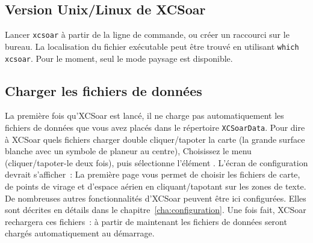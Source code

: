 \subsection*{Version Unix/Linux de XCSoar}
Lancer \verb|xcsoar| à partir de la ligne de commande, ou créer un raccourci sur le 
bureau. La localisation du fichier exécutable peut être trouvé en utilisant
\verb|which xcsoar|. Pour le moment, seul le mode paysage est disponible.

\subsection*{Charger les fichiers de données}\label{sec:loaddatafiles}
La première fois qu'XCSoar est lancé, il ne charge pas automatiquement les
fichiers de données que vous avez placés dans le répertoire \verb|XCSoarData|. 
Pour dire à XCSoar quels fichiers charger double cliquer/tapoter la carte (la grande
surface blanche avec un symbole de planeur au centre),
Choisissez le menu  (cliquer/tapoter-le deux fois), puis sélectionne l'élément
\mbox{.} L'écran de configuration devrait s'afficher~:
La première page vous permet de choisir les fichiers de carte,
de points de virage et d'espace aérien en cliquant/tapotant sur les zones de texte.
De nombreuses autres fonctionnalités d'XCSoar peuvent être ici configurées. Elles sont décrites en détails dans le
chapitre~\ref{cha:configuration}.
Une fois fait, XCSoar rechargera ces fichiers~: à partir de maintenant les fichiers de données
seront chargés automatiquement au démarrage. 

